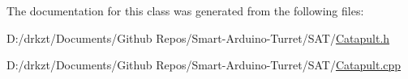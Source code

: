 The documentation for this class was generated from the following files\+:\begin{DoxyCompactItemize}
\item 
D\+:/drkzt/\+Documents/\+Github Repos/\+Smart-\/\+Arduino-\/\+Turret/\+S\+A\+T/\hyperlink{_catapult_8h}{Catapult.\+h}\item 
D\+:/drkzt/\+Documents/\+Github Repos/\+Smart-\/\+Arduino-\/\+Turret/\+S\+A\+T/\hyperlink{_catapult_8cpp}{Catapult.\+cpp}\end{DoxyCompactItemize}

